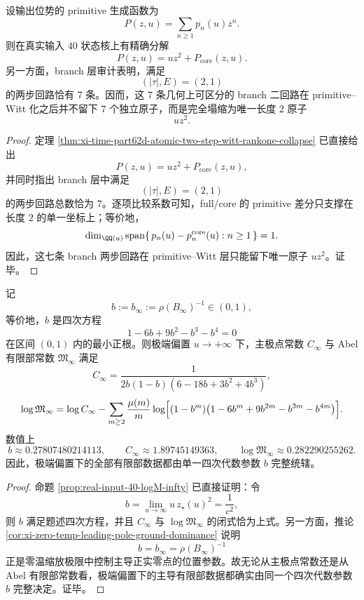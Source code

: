 \begin{theorem}\label{thm:xi-time-part68-seven-branch-two-cycles-collapse-single-atom}
设输出位势的 primitive 生成函数为
\[
P(z,u)=\sum_{n\ge 1}p_n(u)z^n.
\]
则在真实输入 \(40\) 状态核上有精确分解
\[
P(z,u)=uz^2+P_{\mathrm{core}}(z,u).
\]
另一方面，branch 层审计表明，满足
\[
(|\tau|,E)=(2,1)
\]
的两步回路恰有 \(7\) 条。因而，这 \(7\) 条几何上可区分的 branch 二回路在 primitive--Witt 化之后并不留下 \(7\) 个独立原子，而是完全塌缩为唯一长度 \(2\) 原子
\[
uz^2.
\]
\end{theorem}
\begin{proof}
定理 \ref{thm:xi-time-part62d-atomic-two-step-witt-rankone-collapse} 已直接给出
\[
P(z,u)=uz^2+P_{\mathrm{core}}(z,u),
\]
并同时指出 branch 层中满足
\[
(|\tau|,E)=(2,1)
\]
的两步回路总数恰为 \(7\)。逐项比较系数可知，full/core 的 primitive 差分只支撑在长度 \(2\) 的单一坐标上；等价地，
\[
\dim_{\QQ(u)}
\operatorname{span}\{\,p_n(u)-p_n^{\mathrm{core}}(u):n\ge 1\,\}=1.
\]
因此，这七条 branch 两步回路在 primitive--Witt 层只能留下唯一原子 \(uz^2\)。证毕。
\end{proof}

\begin{theorem}[极端偏置有限部由单一四次代数参数完全控制]\label{thm:xi-time-part68-extreme-bias-finitepart-single-quartic-control}
记
\[
b:=b_\infty:=\rho(B_\infty)^{-1}\in(0,1),
\]
等价地，\(b\) 是四次方程
\[
1-6b+9b^2-b^3-b^4=0
\]
在区间 \((0,1)\) 内的最小正根。则极端偏置 \(u\to+\infty\) 下，主极点常数 \(C_\infty\) 与 Abel 有限部常数 \(\mathfrak M_\infty\) 满足
\[
C_\infty=
\frac{1}{2b(1-b)(6-18b+3b^2+4b^3)},
\]
\[
\log\mathfrak M_\infty
=
\log C_\infty
-\sum_{m\ge 2}\frac{\mu(m)}{m}
\log\Bigl[(1-b^m)\bigl(1-6b^m+9b^{2m}-b^{3m}-b^{4m}\bigr)\Bigr].
\]
数值上
\[
b\approx 0.27807480214113,\qquad
C_\infty\approx 1.89745149363,\qquad
\log\mathfrak M_\infty\approx 0.282290255262.
\]
因此，极端偏置下的全部有限部数据都由单一四次代数参数 \(b\) 完整统辖。
\end{theorem}
\begin{proof}
命题 \ref{prop:real-input-40-logM-infty} 已直接证明：令
\[
b=\lim_{u\to\infty}u\,z_\star(u)^2=\frac{1}{c^2},
\]
则 \(b\) 满足题述四次方程，并且 \(C_\infty\) 与 \(\log\mathfrak M_\infty\) 的闭式恰为上式。另一方面，推论 \ref{cor:xi-zero-temp-leading-pole-ground-dominance} 说明
\[
b=b_\infty=\rho(B_\infty)^{-1}
\]
正是零温缩放极限中控制主导正实零点的位置参数。故无论从主极点常数还是从 Abel 有限部常数看，极端偏置下的主导有限部数据都确实由同一个四次代数参数 \(b\) 完整决定。证毕。
\end{proof}


